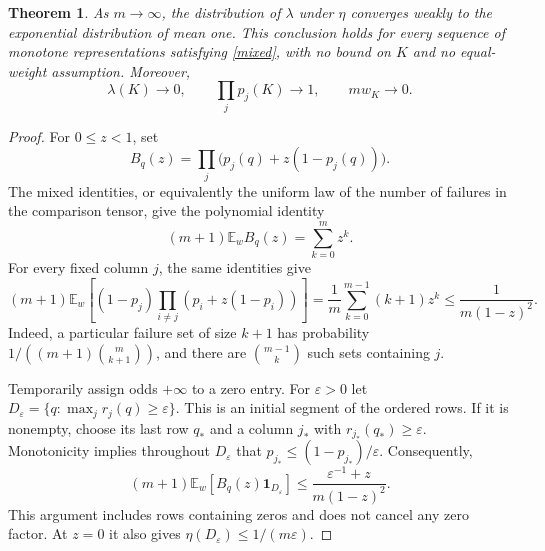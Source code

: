 \documentclass[11pt]{article}
\newtheorem{theorem}{Theorem}
\newcommand{\E}{\mathbb E}
\begin{document}
\begin{theorem}\label{endpoint}
As $m\to\infty$, the distribution of $\lambda$ under $\eta$ converges
weakly to the exponential distribution of mean one. This conclusion
holds for every sequence of monotone representations satisfying
\eqref{mixed}, with no bound on $K$ and no equal-weight assumption.
Moreover,
\[
 \lambda(K)\longrightarrow0,\qquad
 \prod_jp_j(K)\longrightarrow1,\qquad
 m w_K\longrightarrow0.
\]
\end{theorem}
\begin{proof}
For $0\le z<1$, set
\[
 B_q(z)=\prod_j\bigl(p_j(q)+z(1-p_j(q))\bigr).
\]
The mixed identities, or equivalently the uniform law of the number
of failures in the comparison tensor, give the polynomial identity
\begin{equation}\label{pgf}
 (m+1)\E_w B_q(z)=\sum_{k=0}^m z^k.
\end{equation}
For every fixed column $j$, the same identities give
\begin{equation}\label{deriv}
 (m+1)\E_w\left[(1-p_j)\prod_{i\ne j}
       (p_i+z(1-p_i))\right]
 =\frac1m\sum_{k=0}^{m-1}(k+1)z^k
 \le\frac1{m(1-z)^2}.
\end{equation}
Indeed, a particular failure set of size $k+1$ has probability
$1/((m+1)\binom m{k+1})$, and there are $\binom{m-1}k$ such sets
containing $j$.

Temporarily assign odds $+\infty$ to a zero entry. For $\varepsilon>0$
let $D_\varepsilon=\{q:\max_jr_j(q)\ge\varepsilon\}$.
This is an initial segment of the ordered rows. If it is nonempty,
choose its last row $q_*$ and a column $j_*$ with
$r_{j_*}(q_*)\ge\varepsilon$. Monotonicity implies throughout
$D_\varepsilon$ that
$p_{j_*}\le(1-p_{j_*})/\varepsilon$. Consequently,
\begin{equation}\label{bad}
 (m+1)\E_w[B_q(z)\boldsymbol1_{D_\varepsilon}]
 \le\frac{\varepsilon^{-1}+z}{m(1-z)^2}.
\end{equation}
This argument includes rows containing zeros and does not cancel
any zero factor. At $z=0$ it also gives
$\eta(D_\varepsilon)\le1/(m\varepsilon)$.


\end{proof}
\end{document}
